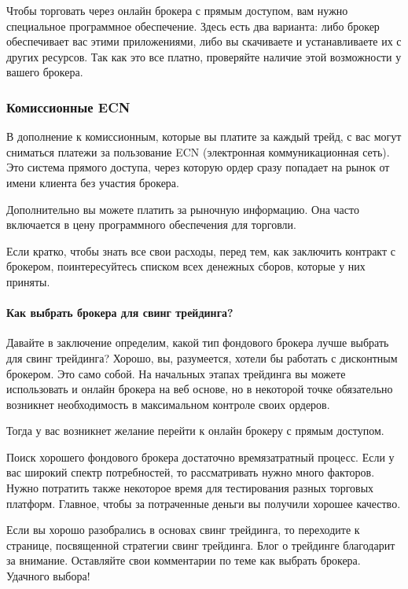 \documentclass{book}
\begin{document}
Чтобы торговать через онлайн брокера с прямым доступом, вам нужно
специальное программное обеспечение. Здесь есть два варианта: либо
брокер обеспечивает вас этими приложениями, либо вы скачиваете и
устанавливаете их с других ресурсов. Так как это все платно,
проверяйте наличие этой возможности у вашего брокера.

\subsubsection{Комиссионные ECN}

В дополнение к комиссионным, которые вы платите за каждый трейд, с вас могут сниматься платежи за пользование ECN (электронная коммуникационная сеть). Это система прямого доступа, через которую ордер сразу попадает на рынок от имени клиента без участия брокера.

Дополнительно вы можете платить за рыночную информацию. Она часто включается в цену программного обеспечения для торговли.

Если кратко, чтобы знать все свои расходы, перед тем, как заключить
контракт с брокером, поинтересуйтесь списком всех денежных сборов,
которые у них приняты.

\paragraph{Как выбрать брокера для свинг трейдинга?}

Давайте в заключение определим, какой тип фондового брокера лучше выбрать для свинг трейдинга? Хорошо, вы, разумеется, хотели бы работать с дисконтным брокером. Это само собой. На начальных этапах трейдинга вы можете использовать и онлайн брокера на веб основе, но в некоторой точке обязательно возникнет необходимость в максимальном контроле своих ордеров.

Тогда у вас возникнет желание перейти к онлайн брокеру с прямым доступом.

Поиск хорошего фондового брокера достаточно времязатратный процесс. Если у вас широкий спектр потребностей, то рассматривать нужно много факторов. Нужно потратить также некоторое время для тестирования разных торговых платформ. Главное, чтобы за потраченные деньги вы получили хорошее качество.

Если вы хорошо разобрались в основах свинг трейдинга, то переходите к странице, посвященной стратегии свинг трейдинга. Блог о трейдинге благодарит за внимание. Оставляйте свои комментарии по теме как выбрать брокера. Удачного выбора!
\end{document}
